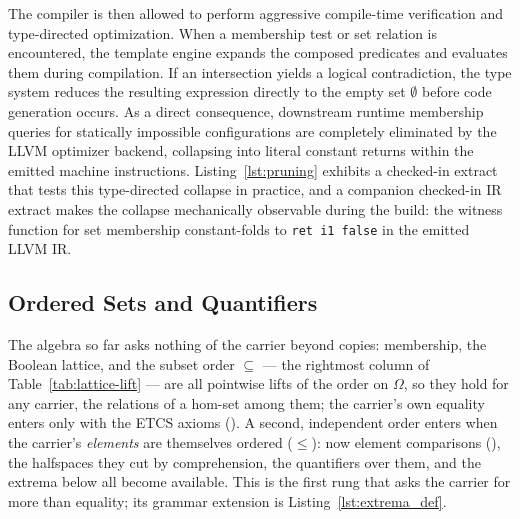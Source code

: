 \documentclass[11pt, a4paper]{article}
\begin{document}
The compiler is then allowed to perform aggressive compile-time verification and type-directed optimization.
When a membership test or set relation is encountered, the template engine expands the composed predicates and evaluates them during compilation.
If an intersection yields a logical contradiction, the type system reduces the resulting expression directly to the empty set $\emptyset$ before code generation occurs.
As a direct consequence, downstream runtime membership queries for statically impossible configurations are completely eliminated by the LLVM optimizer backend, collapsing into literal constant returns within the emitted machine instructions.
Listing~\ref{lst:pruning} exhibits a checked-in extract that tests this type-directed collapse in practice, and a companion checked-in IR extract makes the collapse mechanically observable during the build: the witness function for set membership constant-folds to \texttt{ret i1 false} in the emitted LLVM IR.

\subsection{Ordered Sets and Quantifiers}
\label{sec:ddk_ordered}

The algebra so far asks nothing of the carrier beyond copies: membership, the Boolean lattice, and the subset order $\subseteq$ --- the rightmost column of Table~\ref{tab:lattice-lift} --- are all pointwise lifts of the order on $\Omega$, so they hold for any  carrier, the relations of a hom-set among them; the carrier's own equality enters only with the ETCS axioms ().
A second, independent order enters when the carrier's \emph{elements} are themselves ordered ($\le$): now element comparisons (), the halfspaces they cut by comprehension, the quantifiers over them, and the extrema below all become available.
This is the first rung that asks the carrier for more than equality; its grammar extension is Listing~\ref{lst:extrema_def}.
\end{document}
